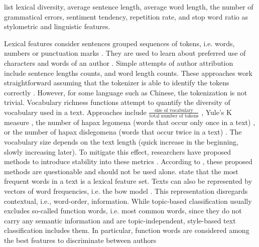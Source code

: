 \citet{bevendorff_overview_2024} list lexical diversity, average sentence length, average word length, 
the number of grammatical errors, sentiment tendency, repetition rate, and stop word ratio as 
stylometric and linguistic features.

Lexical features consider sentences grouped sequences of tokens, i.e. words, numbers or punctuation marks \cite{bevendorff_overview_2024}.
They are used to learn about preferred use of characters and words of an author \cite{elmanarelbouanani_authorship_2014}.
Simple attempts of author attribution include sentence lengths counts, and word length counts.
These approaches work straightforward assuming that the tokenizer is able to identify the tokens correctly \cite{bevendorff_overview_2024,elmanarelbouanani_authorship_2014}.
However, for some language such as Chinese, the tokenization is not trivial.
Vocabulary richness functions attempt to quantify the diversity of vocabulary used in a text.
Approaches include $\frac{\text{size of vocabulary}}{\text{total number of tokens}}$ \cite{elmanarelbouanani_authorship_2014,bevendorff_overview_2024},
Yule's K measure \cite{elmanarelbouanani_authorship_2014},
the number of hapax legomena (words that occur only once in a text) \cite{elmanarelbouanani_authorship_2014,bevendorff_overview_2024}, 
or the number of hapax dislegomena (words that occur twice in a text) \cite{elmanarelbouanani_authorship_2014}.
The vocabulary size depends on the text length (quick increase in the beginning, slowly increasing later).
To mitigate this effect, researchers have proposed methods to introduce stability into these metrics \cite{elmanarelbouanani_authorship_2014,bevendorff_overview_2024}. 
According to \citet{stamatatos_survey_2009}, these proposed methods are questionable and should not be used alone.
\citet{elmanarelbouanani_authorship_2014} state that the most frequent words in a text is a lexical feature set.
Texts can also be represented by vectors of word frequencies, i.e. the \ac{bow} model \cite{bevendorff_overview_2024}.
This representation disregards contextual, i.e., word-order, information.
While topic-based classification usually excludes so-called function words, 
i.e. most common words, since they do not carry any semantic information and are topic-independent, 
style-based text classification includes them.
In particular, function words are considered among the best features to discriminate between authors 
